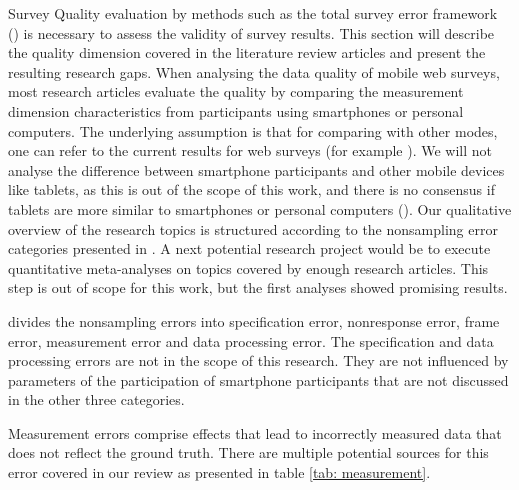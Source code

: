 Survey Quality evaluation by methods such as the total survey error framework (\cite{groves_total_2010}) is necessary to assess the validity of survey results. This section will describe the quality dimension covered in the literature review articles and present the resulting research gaps. When analysing the data quality of mobile web surveys, most research articles evaluate the quality by comparing the measurement dimension characteristics from participants using smartphones or personal computers. The underlying assumption is that for comparing with other modes, one can refer to the current results for web surveys (for example \cite{manfreda_web_2008, ryan_survey_2020, evans_value_2018}). We will not analyse the difference between smartphone participants and other mobile devices like tablets, as this is out of the scope of this work, and there is no consensus if tablets are more similar to smartphones or personal computers (\cite{couper_why_2017}). Our qualitative overview of the research topics is structured according to the nonsampling error categories presented in \cite{biemer_total_2010}. A next potential research project would be to execute quantitative meta-analyses on topics covered by enough research articles. This step is out of scope for this work, but the first analyses showed promising results. 

\cite{biemer_total_2010} divides the nonsampling errors into specification error, nonresponse error, frame error, measurement error and data processing error. The specification and data processing errors are not in the scope of this research. They are not influenced by parameters of the participation of smartphone participants that are not discussed in the other three categories.

Measurement errors comprise effects that lead to incorrectly measured data that does not reflect the ground truth. There are multiple potential sources for this error covered in our review as presented in table \ref{tab: measurement}.


